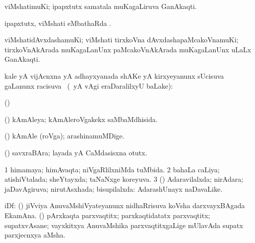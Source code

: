 \bentry
{}
\gl{\nA}
\bmng
viMshatimuKi; ipapxtutx samatala muKagaLiruva GanAkaqti.  
\emng
\eentry

\bentry
{}
\gl{\sapUpa}
\bmng
ipapxtutx, viMshati eMbathaRda \sapUpa. 
\emng
\eentry

\bentry
{}
\gl{\nA}
\bmng
viMshatidAvxdashamuKi; viMshati tirxkoVna dAvxdashapaMcakoVnamuKi;  tirxkoVnAkArada muKagaLanUnx  paMcakoVnAkArada muKagaLanUnx uLaLx GanAkaqti. 
\emng
\eentry

\bentry
{}
\gl{\uparx}
\bmng
kale yA vijAcnxna yA adhayxyanada shAKe yA kirxyeyanunx sUcisuva \nA gaLanunx racisuva \uparx\ (\Eva\ yA \bava vAgi eraDaralilxyU baLake):  
\emng
\eentry

\bentry
{}
\gl{\saMkiSx}
\bmng
(\ca)  
\emng
\eentry

\bentry
{}
\gl{\saMkiSx}
\bmng
{} 
\emng
\eentry

\bentry
{}
\gl{\gu}
\bmng
(\roVshA) kAmAleya; kAmAleroVgakekx saMbaMdhisida. 
\emng
\eentry

\bentry
{}
\gl{\nA}
\bmng
(\roVshA) kAmAle (roVga); arashinamuMDige. 
\emng
\eentry

\bentry
{}
\gl{\nA}
\bmng
(\CaM) savxraBAra; layada yA CaMdasisxna otutx. 
\emng
\eentry

\bentry
{}
\gl{\gu}
\bmng
\bnum
\num{1} himamaya; himAvaqta; niVgaRlilxniMda tuMbida. 
\num{2} bahaLa caLiya; atishiVtalada; sheYtayxda; taNaNxge koreyuva. 
\num{3} (\rUpa) Adaravilalxda; nirAdara; jaDavAgiruva; nirutAsxhada; bisupilalxda:  AdarashUnayx naDavaLike. 
\enum
\emng
\eentry

\bentry
{}
\gl{\nA}
\bmng
iDf: 
\banum
{} (\jiVvi) jiVviya AnuvaMshiVyateyanunx nidhaRrisuva koVsha darxvayxBAgada EkamAna. 
 (\mashA) pArxkaqta parxvaqtitx; parxkaqtidatatx parxvaqtitx; supatxvAsane; vayxkitxya AnuvaMshika parxvaqtitxgaLige mUlavAda supatx parxjecnxya aMsha. 
\eanum
\emng
\eentry

